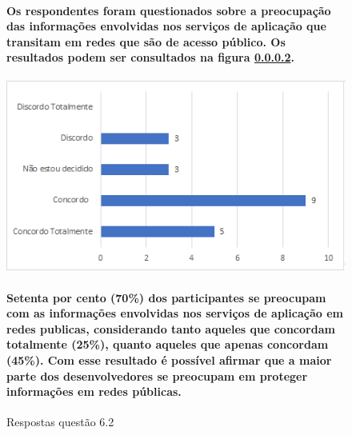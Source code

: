 \begin{figure}[!t]
\centering
\paragraph{Os respondentes foram questionados sobre a preocupação das informações envolvidas nos serviços de aplicação que transitam em redes que são de acesso público. Os resultados podem ser consultados na figura \ref{fig:6.2}.}
\includegraphics[scale=0.7]{figuras das questoes/6.2.png}
\caption{Respostas questão 6.2}
\paragraph{Setenta por cento (70{\%}) dos participantes se preocupam com as informações envolvidas nos serviços de aplicação em redes publicas, considerando tanto aqueles que concordam totalmente (25{\%}), quanto aqueles que apenas concordam (45{\%}). Com esse resultado é possível afirmar que a maior parte dos desenvolvedores se preocupam em proteger informações em redes públicas. }
\label{fig:6.2}
\end{figure}
